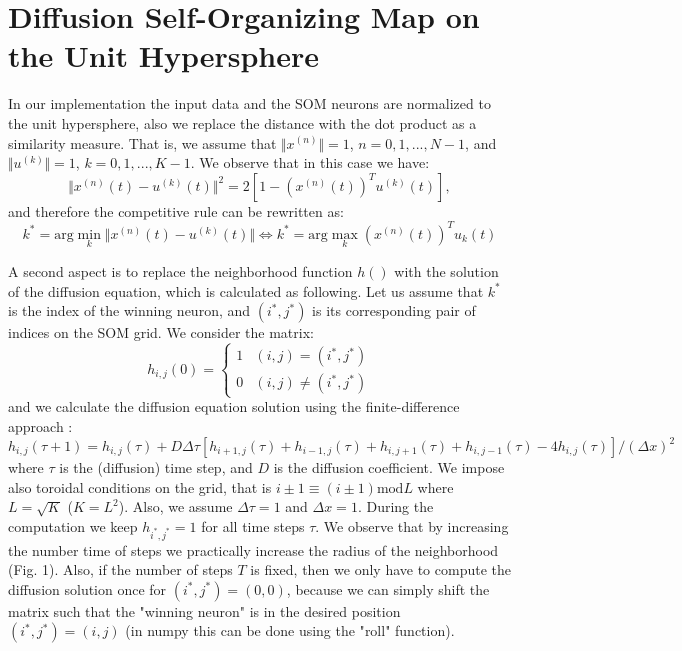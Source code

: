 \documentclass[10pt,english]{article}
\begin{document}
\section{Diffusion Self-Organizing Map on the Unit Hypersphere}

In our implementation the input data and the SOM neurons are normalized to the unit hypersphere, also we replace the distance with the dot product as a similarity measure. 
That is, we assume that $\Vert x^{(n)} \Vert = 1$, $n=0,1,...,N-1$, and $\Vert u^{(k)} \Vert = 1$, $k=0,1,...,K-1$. We observe that in this case we have:
\begin{equation}
\Vert x^{(n)}(t) - u^{(k)}(t) \Vert^2 = 2[1-(x^{(n)}(t))^Tu^{(k)}(t)], 
\end{equation}
and therefore the competitive rule can be rewritten as:
\begin{equation}
k^* = \text{arg} \min_k \Vert x^{(n)}(t) - u^{(k)}(t) \Vert \Leftrightarrow k^* = \text{arg} \max_k (x^{(n)}(t))^T u_k(t)
\end{equation}

A second aspect is to replace the neighborhood function $h()$ with the solution of the diffusion equation, which is calculated as following. 
Let us assume that $k^*$ is the index of the winning neuron, and $(i^*,j^*)$ is its corresponding pair of indices on the SOM grid. 
We consider the matrix: 
\begin{equation}
h_{i,j}(0) =   \begin{cases}
   1  & (i,j) = (i^*,j^*) \\
   0 & (i,j) \neq (i^*,j^*)
  \end{cases}
\end{equation}
and we calculate the diffusion equation solution using the finite-difference approach \cite{key-7}:
\begin{equation}
h_{i,j}(\tau+1) = h_{i,j}(\tau) + D \Delta \tau [h_{i+1,j}(\tau)+h_{i-1,j}(\tau)+h_{i,j+1}(\tau)+h_{i,j-1}(\tau)-4h_{i,j}(\tau)]/(\Delta x)^2
\end{equation}
where $\tau$ is the (diffusion) time step, and $D$ is the diffusion coefficient. We impose also toroidal conditions on the grid, 
that is $i\pm1 \equiv (i\pm1)\text{mod}L$ where $L=\sqrt{K}$ ($K=L^2$). Also, we assume $\Delta \tau=1$ and $\Delta x=1$. During the computation we keep $h_{i^*,j^*}=1$ for all time steps $\tau$. 
We observe that by increasing the number time of steps we practically increase the radius of the neighborhood (Fig. 1). 
Also, if the number of steps $T$ is fixed, then we only have to compute the diffusion solution once for $(i^*,j^*)=(0,0)$, 
because we can simply shift the matrix such that the "winning neuron" is in the desired position $(i^*,j^*)=(i,j)$ (in numpy this can be done using the "$\text{roll}$" function). 
\end{document}
